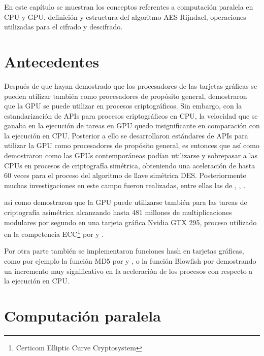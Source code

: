 \documentclass[../main/main.tex]{subfiles}
\begin{document}
\espacio
  En este capítulo se muestran los conceptos referentes a computación paralela en CPU y GPU, definición y estructura del algoritmo AES Rijndael, operaciones utilizadas para el cifrado y descifrado.

  \section{Antecedentes}

  Después de que \cite{thesis:two_hash_cuda} hayan demostrado que los procesadores de las tarjetas gráficas se pueden utilizar también como procesadores de propósito general, \cite{article:secret_key_gpu} demostraron que la GPU se puede utilizar en procesos criptográficos. Sin embargo, con la estandarización de APIs para procesos criptográficos en CPU, la velocidad que se ganaba en la ejecución de tareas en GPU quedo insignificante en comparación con la ejecución en CPU. Posterior a ello se desarrollaron estándares de APIs para utilizar la GPU como procesadores de propósito general, es entonces que \cite{article:symmetric_key_gpu} así como \cite{article:practical_symmetric_key_gpu} demostraron como las GPUs contemporáneas podían utilizarse y sobrepasar a las CPUs en procesos de criptografía simétrica, obteniendo una aceleración de hasta 60 veces para el proceso del algoritmo de llave simétrica DES. Posteriormente muchas investigaciones en este campo fueron realizadas, entre ellas las de \cite{article:cuda_aes_hardware_accelerator}, \cite{article:encryption_commodity_gpu}, \cite{article:design_parallel_aes_cuda}.

  \cite{article:exploiting_gpu_asymmetric_cryptography} así como \cite{article:efficient_cryptography_gpu} demostraron que la GPU puede utilizarse también para las tareas de criptografía asimétrica alcanzando hasta 481 millones de multiplicaciones modulares por segundo en una tarjeta gráfica Nvidia GTX 295, proceso utilizado en la competencia ECC\footnote{Certicom Elliptic Curve Cryptosystem} por \cite{report:ecm_on_gpu} y \cite{report:2k_130_on_nvidia}.

  Por otra parte también se implementaron funciones hash en tarjetas gráficas, como por ejemplo la función MD5 por \cite{report:throughput_md5_gpu} y \cite{article:md5_rc4_gpu_cuda}, o la función Blowfish por \cite{report:new_speed_time_encryption_gpu} demostrando un incremento muy significativo en la aceleración de los procesos con respecto a la ejecución en CPU.

  \section{Computación paralela}
\end{document}
